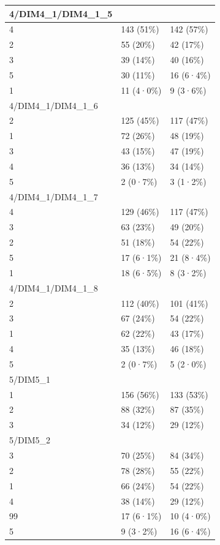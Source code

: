\documentclass[
]{book}
\begin{document}
\begin{tabular}{l|l|l}
\hline
4/DIM4\_1/DIM4\_1\_5 &  & \\
\hline
4 & 143 (51\%) & 142 (57\%)\\
\hline
2 & 55 (20\%) & 42 (17\%)\\
\hline
3 & 39 (14\%) & 40 (16\%)\\
\hline
5 & 30 (11\%) & 16 (6·4\%)\\
\hline
1 & 11 (4·0\%) & 9 (3·6\%)\\
\hline
4/DIM4\_1/DIM4\_1\_6 &  & \\
\hline
2 & 125 (45\%) & 117 (47\%)\\
\hline
1 & 72 (26\%) & 48 (19\%)\\
\hline
3 & 43 (15\%) & 47 (19\%)\\
\hline
4 & 36 (13\%) & 34 (14\%)\\
\hline
5 & 2 (0·7\%) & 3 (1·2\%)\\
\hline
4/DIM4\_1/DIM4\_1\_7 &  & \\
\hline
4 & 129 (46\%) & 117 (47\%)\\
\hline
3 & 63 (23\%) & 49 (20\%)\\
\hline
2 & 51 (18\%) & 54 (22\%)\\
\hline
5 & 17 (6·1\%) & 21 (8·4\%)\\
\hline
1 & 18 (6·5\%) & 8 (3·2\%)\\
\hline
4/DIM4\_1/DIM4\_1\_8 &  & \\
\hline
2 & 112 (40\%) & 101 (41\%)\\
\hline
3 & 67 (24\%) & 54 (22\%)\\
\hline
1 & 62 (22\%) & 43 (17\%)\\
\hline
4 & 35 (13\%) & 46 (18\%)\\
\hline
5 & 2 (0·7\%) & 5 (2·0\%)\\
\hline
5/DIM5\_1 &  & \\
\hline
1 & 156 (56\%) & 133 (53\%)\\
\hline
2 & 88 (32\%) & 87 (35\%)\\
\hline
3 & 34 (12\%) & 29 (12\%)\\
\hline
5/DIM5\_2 &  & \\
\hline
3 & 70 (25\%) & 84 (34\%)\\
\hline
2 & 78 (28\%) & 55 (22\%)\\
\hline
1 & 66 (24\%) & 54 (22\%)\\
\hline
4 & 38 (14\%) & 29 (12\%)\\
\hline
99 & 17 (6·1\%) & 10 (4·0\%)\\
\hline
5 & 9 (3·2\%) & 16 (6·4\%)\\

\end{tabular}
\end{document}
